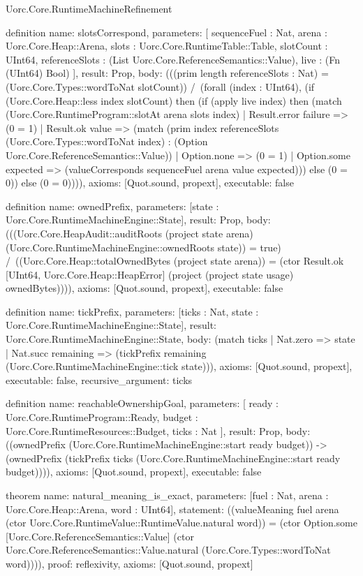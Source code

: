 \begin{lexlean}{Uorc.Core.RuntimeMachineRefinement}
\begin{semanticmodule}
definition{
  name: slotsCorrespond,
  parameters: [
    sequenceFuel : Nat,
    arena : Uorc.Core.Heap::Arena,
    slots : Uorc.Core.RuntimeTable::Table,
    slotCount : UInt64,
    referenceSlots : (List Uorc.Core.ReferenceSemantics::Value),
    live : (Fn (UInt64) Bool)
  ],
  result: Prop,
  body: (((prim length referenceSlots : Nat) = (Uorc.Core.Types::wordToNat slotCount)) /\ (forall (index : UInt64), (if (Uorc.Core.Heap::less index slotCount) then (if (apply live index) then (match (Uorc.Core.RuntimeProgram::slotAt arena slots index)
    | Result.error failure => (0 = 1)
    | Result.ok value => (match (prim index referenceSlots (Uorc.Core.Types::wordToNat index) : (Option Uorc.Core.ReferenceSemantics::Value))
      | Option.none => (0 = 1)
      | Option.some expected => (valueCorresponds sequenceFuel arena value expected))) else (0 = 0)) else (0 = 0)))),
  axioms: [Quot.sound, propext],
  executable: false
}

definition{
  name: ownedPrefix,
  parameters: [state : Uorc.Core.RuntimeMachineEngine::State],
  result: Prop,
  body: (((Uorc.Core.HeapAudit::auditRoots (project state arena) (Uorc.Core.RuntimeMachineEngine::ownedRoots state)) = true) /\ ((Uorc.Core.Heap::totalOwnedBytes (project state arena)) = (ctor Result.ok [UInt64, Uorc.Core.Heap::HeapError] (project (project state usage) ownedBytes)))),
  axioms: [Quot.sound, propext],
  executable: false
}

definition{
  name: tickPrefix,
  parameters: [ticks : Nat, state : Uorc.Core.RuntimeMachineEngine::State],
  result: Uorc.Core.RuntimeMachineEngine::State,
  body: (match ticks
    | Nat.zero => state
    | Nat.succ remaining => (tickPrefix remaining (Uorc.Core.RuntimeMachineEngine::tick state))),
  axioms: [Quot.sound, propext],
  executable: false,
  recursive_argument: ticks
}

definition{
  name: reachableOwnershipGoal,
  parameters: [
    ready : Uorc.Core.RuntimeProgram::Ready,
    budget : Uorc.Core.RuntimeResources::Budget,
    ticks : Nat
  ],
  result: Prop,
  body: ((ownedPrefix (Uorc.Core.RuntimeMachineEngine::start ready budget)) -> (ownedPrefix (tickPrefix ticks (Uorc.Core.RuntimeMachineEngine::start ready budget)))),
  axioms: [Quot.sound, propext],
  executable: false
}

theorem{
  name: natural_meaning_is_exact,
  parameters: [fuel : Nat, arena : Uorc.Core.Heap::Arena, word : UInt64],
  statement: ((valueMeaning fuel arena (ctor Uorc.Core.RuntimeValue::RuntimeValue.natural word)) = (ctor Option.some [Uorc.Core.ReferenceSemantics::Value] (ctor Uorc.Core.ReferenceSemantics::Value.natural (Uorc.Core.Types::wordToNat word)))),
  proof: reflexivity{},
  axioms: [Quot.sound, propext]
}


\end{semanticmodule}
\end{lexlean}
